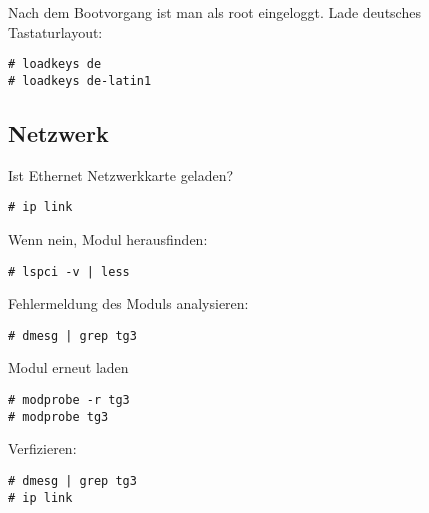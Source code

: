 Nach dem Bootvorgang ist man als root eingeloggt.
Lade deutsches Tastaturlayout:
\begin{lstlisting}[style=Bash]
# loadkeys de
# loadkeys de-latin1
\end{lstlisting}

\subsection{Netzwerk}
\label{subsec:network}
Ist Ethernet Netzwerkkarte geladen?
\begin{lstlisting}[style=Bash]
# ip link 
\end{lstlisting}
Wenn nein, Modul herausfinden:
\begin{lstlisting}[style=Bash]
# lspci -v | less 
\end{lstlisting}
Fehlermeldung des Moduls analysieren:
\begin{lstlisting}[style=Bash]
# dmesg | grep tg3 
\end{lstlisting}
Modul erneut laden
\begin{lstlisting}[style=Bash]
# modprobe -r tg3
# modprobe tg3
\end{lstlisting}
Verfizieren:
\begin{lstlisting}[style=Bash]
# dmesg | grep tg3 
# ip link
\end{lstlisting}

